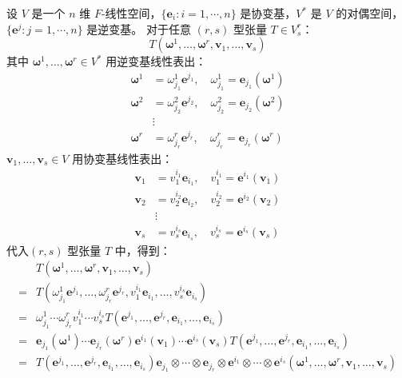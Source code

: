 \begin{definition}[张量的分量表示]
    设 $V$ 是一个 $n$ 维 $F$-线性空间，$\{\mathbf{e}_i:i=1,\cdots,n\}$ 是协变基，$V^*$ 是 $V$ 的对偶空间，$\{\mathbf{e}^j:j=1,\cdots,n\}$ 是逆变基。
    对于任意 $(r,s)$ 型张量 $T \in V^r_s$：
    \[
        T(\bm{\omega}^1,\ldots,\bm{\omega}^r,\mathbf{v}_1,\ldots,\mathbf{v}_s)
    \]
    其中 $\bm{\omega}^1,\ldots,\bm{\omega}^r \in V^*$ 用逆变基线性表出：
    \begin{align*}
        \bm{\omega}^1 &= \omega^1_{j_1} \mathbf{e}^{j_1},\quad \omega^1_{j_1} = \mathbf{e}_{j_1}(\bm{\omega}^1)\\
        \bm{\omega}^2 &= \omega^2_{j_2} \mathbf{e}^{j_2},\quad \omega^2_{j_2} = \mathbf{e}_{j_2}(\bm{\omega}^2)\\
        &\vdots\\
        \bm{\omega}^r &= \omega^r_{j_r} \mathbf{e}^{j_r},\quad \omega^r_{j_r} = \mathbf{e}_{j_r}(\bm{\omega}^r)
    \end{align*}
    $\mathbf{v}_1,\ldots,\mathbf{v}_s \in V$ 用协变基线性表出：
    \begin{align*}
        \mathbf{v}_1 &= v_1^{i_1} \mathbf{e}_{i_1},\quad v_1^{i_1} = \mathbf{e}^{i_1}(\mathbf{v}_1)\\
        \mathbf{v}_2 &= v_2^{i_2} \mathbf{e}_{i_2},\quad v_2^{i_2} = \mathbf{e}^{i_2}(\mathbf{v}_2)\\
        &\vdots\\
        \mathbf{v}_s &= v_s^{i_s} \mathbf{e}_{i_s},\quad v_s^{i_s} = \mathbf{e}^{i_s}(\mathbf{v}_s)
    \end{align*}
    代入$(r,s)$ 型张量 $T$ 中，得到：
    \begin{align*}
        &T(\bm{\omega}^1,\ldots,\bm{\omega}^r,\mathbf{v}_1,\ldots,\mathbf{v}_s)\\
        =& T(\omega^1_{j_1} \mathbf{e}^{j_1},\ldots,\omega^r_{j_r} \mathbf{e}^{j_r},v_1^{i_1} \mathbf{e}_{i_1},\ldots,v_s^{i_s} \mathbf{e}_{i_s})\\
        =& \omega^1_{j_1}\cdots \omega^r_{j_r} v_1^{i_1}\cdots v_s^{i_s} T(\mathbf{e}^{j_1},\ldots,\mathbf{e}^{j_r},\mathbf{e}_{i_1},\ldots,\mathbf{e}_{i_s})\\
        =& \mathbf{e}_{j_1}(\bm{\omega}^1)\cdots \mathbf{e}_{j_r}(\bm{\omega}^r) \mathbf{e}^{i_1}(\mathbf{v}_1)\cdots \mathbf{e}^{i_s}(\mathbf{v}_s)T(\mathbf{e}^{j_1},\ldots,\mathbf{e}^{j_r},\mathbf{e}_{i_1},\ldots,\mathbf{e}_{i_s})\\
        =& T(\mathbf{e}^{j_1},\ldots,\mathbf{e}^{j_r},\mathbf{e}_{i_1},\ldots,\mathbf{e}_{i_s}) \mathbf{e}_{j_1} \otimes \cdots \otimes \mathbf{e}_{j_r} \otimes \mathbf{e}^{i_1} \otimes \cdots \otimes \mathbf{e}^{i_s} (\bm{\omega}^1,\ldots,\bm{\omega}^r,\mathbf{v}_1,\ldots,\mathbf{v}_s)

\end{align*}
\end{definition}
